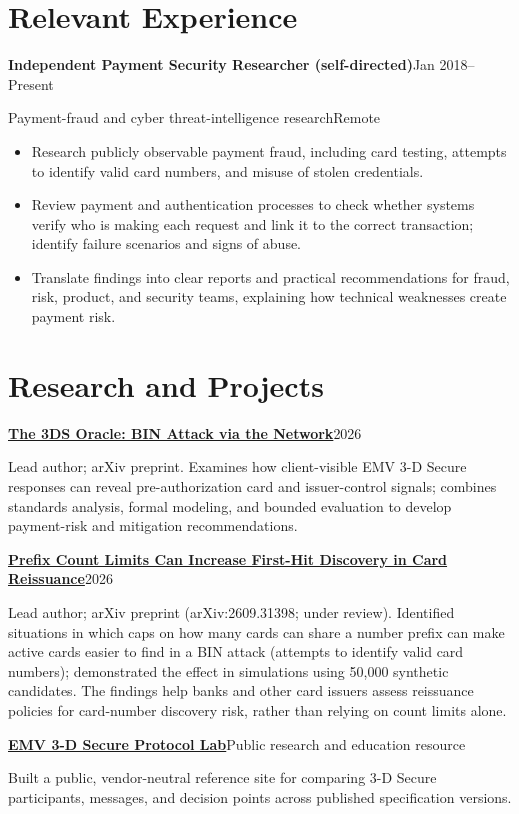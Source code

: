 \documentclass[10pt,a4paper]{article}
\newcommand{\entry}[4]{\textbf{#1}\hfill #2\par {\color{muted}#3}\hfill {\color{muted}#4}\par}
\begin{document}
\section*{Relevant Experience}
\entry{Independent Payment Security Researcher (self-directed)}{Jan 2018--Present}{Payment-fraud and cyber threat-intelligence research}{Remote}
\begin{itemize}
  \item Research publicly observable payment fraud, including card testing, attempts to identify valid card numbers, and misuse of stolen credentials.
  \item Review payment and authentication processes to check whether systems verify who is making each request and link it to the correct transaction; identify failure scenarios and signs of abuse.
  \item Translate findings into clear reports and practical recommendations for fraud, risk, product, and security teams, explaining how technical weaknesses create payment risk.
\end{itemize}

\section*{Research and Projects}
\textbf{\href{https://arxiv.org/abs/2610.32206}{The 3DS Oracle: BIN Attack via the Network}}\hfill 2026\par
Lead author; arXiv preprint. Examines how client-visible EMV 3-D Secure responses can reveal pre-authorization card and issuer-control signals; combines standards analysis, formal modeling, and bounded evaluation to develop payment-risk and mitigation recommendations.\par
\vspace{2pt}
\textbf{\href{https://arxiv.org/abs/2609.31398}{Prefix Count Limits Can Increase First-Hit Discovery in Card Reissuance}}\hfill 2026\par
Lead author; arXiv preprint (arXiv:2609.31398; under review). Identified situations in which caps on how many cards can share a number prefix can make active cards easier to find in a BIN attack (attempts to identify valid card numbers); demonstrated the effect in simulations using 50,000 synthetic candidates. The findings help banks and other card issuers assess reissuance policies for card-number discovery risk, rather than relying on count limits alone.\par
\vspace{2pt}
\textbf{\href{https://cnpshield.github.io/3dslab/}{EMV 3-D Secure Protocol Lab}}\hfill Public research and education resource\par
Built a public, vendor-neutral reference site for comparing 3-D Secure participants, messages, and decision points across published specification versions.\par
\vspace{2pt}
\end{document}

